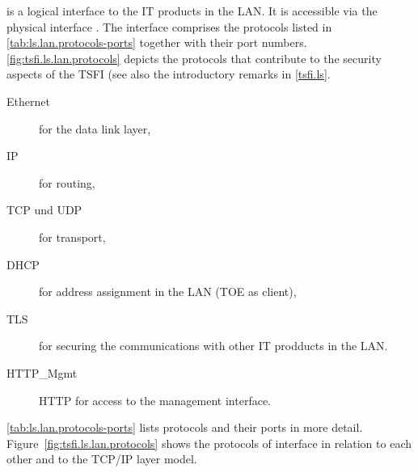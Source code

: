 


\lslan{} is a logical interface to the IT products in the LAN. It is accessible
via the physical interface . The interface comprises the protocols
listed in \autoref{tab:ls.lan.protocols-ports} together with their port
numbers. \autoref{fig:tsfi.ls.lan.protocols} depicts the protocols that
contribute to the security aspects of the TSFI (see also the introductory
remarks in \autoref{tsfi.ls}.

\begin{description}
\item[Ethernet] for the data link layer,
\item[IP] for routing,	
\item[TCP und UDP] for transport,
\item[DHCP] for address assignment in the LAN (TOE as client),
\item[TLS] for securing the communications with other IT prodducts in the LAN.
\item[HTTP\_Mgmt] HTTP for access to the management interface.
\end{description}

\autoref{tab:ls.lan.protocols-ports} lists protocols and their ports in more
detail. Figure~\vref{fig:tsfi.ls.lan.protocols} shows the protocols of interface
\lslan{} in relation to each other and to the TCP/IP layer model.


